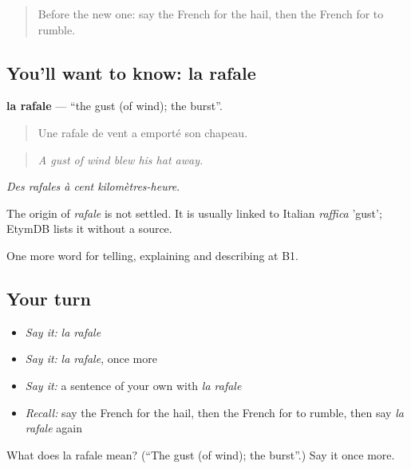 \begin{quote}
Before the new one: say the French for the hail, then the French for to rumble.
\end{quote}

\subsection*{You'll want to know: la rafale}
\textbf{la rafale} — \textquotedblleft{}the gust (of wind); the burst\textquotedblright{}.

\begin{quote}
Une rafale de vent a emporté son chapeau.
\end{quote}

\begin{quote}
\emph{A gust of wind blew his hat away.}
\end{quote}

\emph{Des rafales à cent kilomètres-heure}.

\begin{cousinweb}
The origin of \emph{rafale} is not settled. It is usually linked to Italian \emph{raffica} 'gust'; EtymDB lists it without a source.
\end{cousinweb}

\begin{grammarlens}[title={What you've built}]
One more word for telling, explaining and describing at B1.
\end{grammarlens}

\subsection*{Your turn}
\begin{itemize}
\raggedright
  \item \emph{Say it:} \emph{la rafale}
  \item \emph{Say it:} \emph{la rafale}, once more
  \item \emph{Say it:} a sentence of your own with \emph{la rafale}
  \item \emph{Recall:} say the French for the hail, then the French for to rumble, then say \emph{la rafale} again
\end{itemize}

\begin{tcolorbox}[breakable,colback=teal!4,colframe=teal!35!black,title={Before you move on}]
What does la rafale mean? (\textquotedblleft{}The gust (of wind); the burst\textquotedblright{}.) Say it once more.
\end{tcolorbox}

